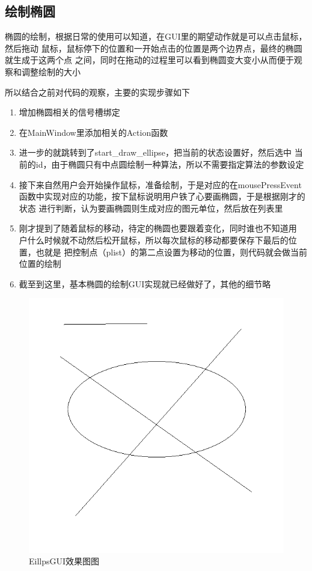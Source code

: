 \documentclass[a4paper,UTF8]{article}
\theoremstyle{definition}
\begin{document}
\subsection{绘制椭圆}
椭圆的绘制，根据日常的使用可以知道，在GUI里的期望动作就是可以点击鼠标，然后拖动
鼠标，鼠标停下的位置和一开始点击的位置是两个边界点，最终的椭圆就生成于这两个点
之间，同时在拖动的过程里可以看到椭圆变大变小从而便于观察和调整绘制的大小

所以结合之前对代码的观察，主要的实现步骤如下
\begin{enumerate}
    \item 增加椭圆相关的信号槽绑定
    
    \item 在MainWindow里添加相关的Action函数
    
    \item 进一步的就跳转到了start\_draw\_ellipse，把当前的状态设置好，然后选中
    当前的id，由于椭圆只有中点圆绘制一种算法，所以不需要指定算法的参数设定

    \item 接下来自然用户会开始操作鼠标，准备绘制，于是对应的在mousePressEvent
    函数中实现对应的功能，按下鼠标说明用户铁了心要画椭圆，于是根据刚才的状态
    进行判断，认为要画椭圆则生成对应的图元单位，然后放在列表里

    \item 刚才提到了随着鼠标的移动，待定的椭圆也要跟着变化，同时谁也不知道用
    户什么时候就不动然后松开鼠标，所以每次鼠标的移动都要保存下最后的位置，也就是
    把控制点（plist）的第二点设置为移动的位置，则代码就会做当前位置的绘制
    
    \item 截至到这里，基本椭圆的绘制GUI实现就已经做好了，其他的细节略
\end{enumerate}

\begin{figure}[h]
	\centering
	\includegraphics[scale=0.3]{figure/EillpsGUI.png}
	\caption{EillpsGUI效果图图}
	\label{fig:EillpsGUI}
\end{figure}
\end{document}
